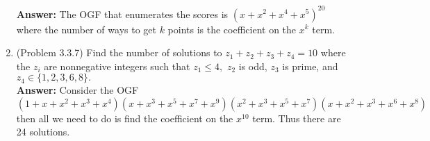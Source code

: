 \documentclass{amsart}
\begin{document}
\begin{enumerate}
\textbf{Answer:} The OGF that enumerates the scores is $(x+x^2+x^4+x^5)^{20}$ where the number of ways to get $k$ points is the coefficient on the $x^k$ term.\\


\item (Problem 3.3.7) Find the number of solutions to $z_1+z_2+z_3+z_4=10$ where the $z_i$ are nonnegative integers such that $z_1 \leq 4,$ $z_2$ is odd, $z_3$ is prime, and $z_4 \in \{1,2,3,6,8\}.$\\

\textbf{Answer:} Consider the OGF $(1+x+x^2+x^3+x^4)(x+x^3+x^5+x^7+x^9)(x^2+x^3+x^5+x^7)(x+x^2+x^3+x^6+x^8)$ then all we need to do is find the coefficient on the $x^{10}$ term. Thus there are 24 solutions.

\end{enumerate}
\end{document}
